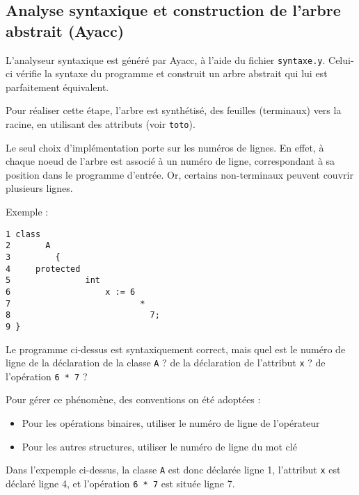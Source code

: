 \subsection{Analyse syntaxique et construction de l'arbre abstrait (Ayacc)}

L'analyseur syntaxique est généré par Ayacc, à l'aide du fichier \verb!syntaxe.y!. Celui-ci vérifie la syntaxe du programme et construit un arbre abstrait qui lui est parfaitement équivalent.

Pour réaliser cette étape, l'arbre est synthétisé, des feuilles (terminaux) vers la racine, en utilisant des attributs (voir \verb!toto!).

Le seul choix d'implémentation porte sur les numéros de lignes. En effet, à chaque noeud de l'arbre est associé à un numéro de ligne, correspondant à sa position dans le programme d'entrée. Or, certains non-terminaux peuvent couvrir plusieurs lignes.

Exemple :

\begin{verbatim}
1 class 
2       A
3         {
4     protected
5               int
6                   x := 6
7                          *
8                            7;
9 }
\end{verbatim}

Le programme ci-dessus est syntaxiquement correct, mais quel est le numéro de ligne de la déclaration de la classe \verb!A! ? de la déclaration de l'attribut \verb!x! ? de l'opération \verb!6 * 7! ?

Pour gérer ce phénomène, des conventions on été adoptées :
\begin{itemize}
\item Pour les opérations binaires, utiliser le numéro de ligne de l'opérateur
\item Pour les autres structures, utiliser le numéro de ligne du mot clé
\end{itemize}

Dans l'expemple ci-dessus, la classe \verb!A! est donc déclarée ligne 1, l'attribut \verb!x! est déclaré ligne 4, et l'opération \verb!6 * 7! est située ligne 7.
